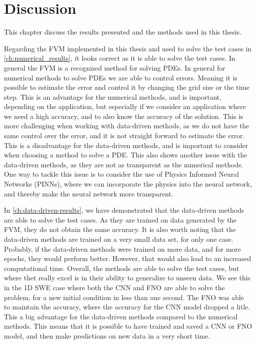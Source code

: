 \chapter{Discussion}\label{ch:discussion}
This chapter discuss the results presented and the methods used in this thesis.

Regarding the FVM implemented in this thesis and used to solve the test cases in \autoref{ch:numerical_results}, it looks correct as it is able to solve the test cases.
In general the FVM is a recognized method for solving PDEs.
In general for numerical methods to solve PDEs we are able to control errors. 
Meaning it is possible to estimate the error and control it by changing the grid size or the time step.
This is an advantage for the numerical methods, and is important, depending on the application, but especially if we consider an application where we need a high accuracy, and to also know the accuracy of the solution.
This is more challenging when working with data-driven methods, as we do not have the same control over the error, and it is not straight forward to estimate the error.
This is a disadvantage for the data-driven methods, and is important to consider when choosing a method to solve a PDE.
This also shows another issue with the data-driven methods, as they are not as transparent as the numerical methods.
One way to tackle this issue is to consider the use of Physics Informed Neural Networks (PINNs), where we can incorporate the physics into the neural network, and thereby make the neural network more transparent.


In \autoref{ch:data-driven-results}, we have demonstrated that the data-driven methods are able to solve the test cases.
As they are trained on data generated by the FVM, they do not obtain the same accuracy. 
It is also worth noting that the data-driven methods are trained on a very small data set, for only one case.
Probably, if the data-driven methods were trained on more data, and for more epochs, they would perform better.
However, that would also lead to an increased computational time. 
Overall, the methods are able to solve the test cases, but where thet really excel is in their ability to generalize to unseen data. 
We see this in the 1D SWE case where both the CNN and FNO are able to solve the problem, for a new initial condition in less than one second.
The FNO was able to maintain the accuracy, where the accuracy for the CNN model dropped a litle.
This a big advantage for the data-driven methods compared to the numerical methods. 
This means that it is possible to have trained and saved a CNN or FNO model, and then make predictions on new data in a very short time. 

